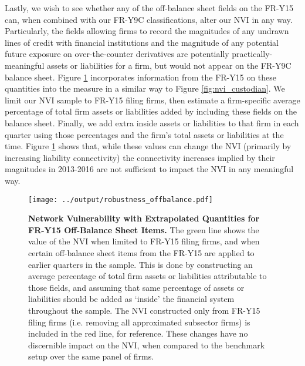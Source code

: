 Lastly, we wish to see whether any of the off-balance sheet fields on the FR-Y15 can, when combined with our FR-Y9C classifications, alter our NVI in any way. Particularly, the fields allowing firms to record the magnitudes of any undrawn lines of credit with financial institutions and the magnitude of any potential future exposure on over-the-counter derivatives are potentially practically-meaningful assets or liabilities for a firm, but would not appear on the FR-Y9C balance sheet. Figure \ref{fig:nvi_offbalance} incorporates information from the FR-Y15 on these quantities into the measure in a similar way to Figure \ref{fig:nvi_custodian}. We limit our NVI sample to FR-Y15 filing firms, then estimate a firm-specific average percentage of total firm assets or liabilities added by including these fields on the balance sheet. Finally, we add extra inside assets or liabilities to that firm in each quarter using those percentages and the firm's total assets or liabilities at the time. Figure \ref{fig:nvi_offbalance} shows that, while these values can change the NVI (primarily by increasing liability connectivity) the connectivity increases implied by their magnitudes in 2013-2016 are not sufficient to impact the NVI in any meaningful way.

\begin{figure}[H]
\begin{center}
\texttt{[image: ../output/robustness\_offbalance.pdf]}
\end{center}
\caption[]{\textbf{Network Vulnerability with Extrapolated Quantities for FR-Y15 Off-Balance Sheet Items.} The green line shows the value of the NVI when limited to FR-Y15 filing firms, and when certain off-balance sheet items from the FR-Y15 are applied to earlier quarters in the sample. This is done by constructing an average percentage of total firm assets or liabilities attributable to those fields, and assuming that same percentage of assets or liabilities should be added as `inside' the financial system throughout the sample. The NVI constructed only from FR-Y15 filing firms (i.e. removing all approximated subsector firms) is included in the red line, for reference. These changes have no discernible impact on the NVI, when compared to the benchmark setup over the same panel of firms.}\label{fig:nvi_offbalance}
\end{figure}